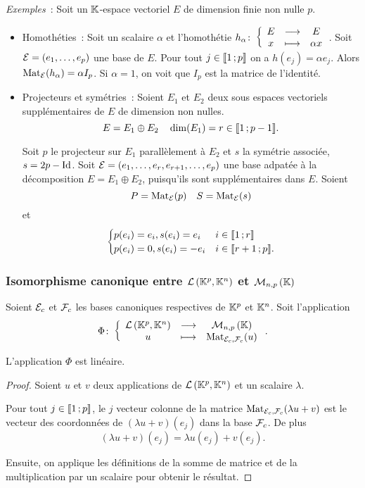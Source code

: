 \emph{Exemples}~: Soit un \(\mathbb{K}\)-espace vectoriel \(E\) de dimension finie non nulle \(p\).
\begin{itemize}
\item Homothéties~: Soit un scalaire \(\alpha\) et l'homothétie \(h_\alpha\colon \left\{\begin{array}{ccc} E & \longrightarrow &E\\ x & \longmapsto & \alpha x \end{array} \right.\). Soit \(\mathcal{E}=(e_1,\ldots, e_p)\) une base de \(E\). Pour tout \(j \in \mathopen{\llbracket}1\mathclose{}\mathpunct{};p\mathclose{\rrbracket}\) on a \(h(e_j)=\alpha e_j\). Alors \(\mathrm{Mat}_{\mathcal{E}}(h_\alpha)=\alpha I_p\). Si \(\alpha=1\), on voit que \(I_p\) est la matrice de l'identité.
\item Projecteurs et symétries~: Soient \(E_1\) et \(E_2\) deux sous espaces vectoriels supplémentaires de \(E\) de dimension non nulles.
  \begin{equation}
    E=E_1 \oplus E_2 \quad \dim(E_1)=r \in \mathopen{\llbracket}1\mathclose{}\mathpunct{};p-1\mathclose{\rrbracket}.
  \end{equation}

Soit \(p\) le projecteur sur \(E_1\) parallèlement à \(E_2\) et \(s\) la symétrie associée, \(s=2p -\operatorname{Id}\). Soit \(\mathcal{E}=(e_1, \ldots, e_r, e_{r+1}, \ldots, e_p)\) une base adpatée à la décomposition \(E=E_1 \oplus E_2\), puisqu'ils sont supplémentaires dans \(E\). Soient
\begin{equation}
  P=\mathrm{Mat}_{\mathcal{E}}(p) \quad S=\mathrm{Mat}_{\mathcal{E}}(s)
\end{equation}
et
\begin{equation}
  \begin{cases}
    p(e_i)=e_i, s(e_i)=e_i & i \in \mathopen{\llbracket}1\mathclose{}\mathpunct{};r\mathclose{\rrbracket} \\
    p(e_i)=0, s(e_i)=-e_i & i \in \mathopen{\llbracket}r+1\mathclose{}\mathpunct{};p\mathclose{\rrbracket}.
  \end{cases}
\end{equation}
\end{itemize}

\subsubsection{Isomorphisme canonique entre \(\mathcal{L}\left(\mathbb{K}^p,\mathbb{K}^n\right)\) et \(\mathcal{M}_{n,p}\left(\mathbb{K}\right)\)}


Soient \(\mathcal{E}_c\) et \(\mathcal{F}_c\) les bases canoniques respectives de \(\mathbb{K}^p\) et \(\mathbb{K}^n\). Soit l'application \[\Phi\colon \left\{\begin{array}{ccc} \mathcal{L}\left(\mathbb{K}^p,\mathbb{K}^n\right) & \longrightarrow &\mathcal{M}_{n,p}\left(\mathbb{K}\right)\\ u & \longmapsto & \mathrm{Mat}_{\mathcal{E}_c,\mathcal{F}_c}(u) \end{array} \right..\]

\begin{prop}
  L'application \(\Phi\) est linéaire.
\end{prop}
\begin{proof}
  Soient \(u\) et \(v\) deux applications de \(\mathcal{L}\left(\mathbb{K}^p,\mathbb{K}^n\right)\) et un scalaire \(\lambda\). 

Pour tout \(j \in \mathopen{\llbracket}1\mathclose{}\mathpunct{};p\mathclose{\rrbracket}\), le \(j\)\ieme{} vecteur colonne de la matrice \(\mathrm{Mat}_{\mathcal{E}_c,\mathcal{F}_c}(\lambda u+v)\) est le vecteur des coordonnées de \((\lambda u+v)(e_j)\) dans la base \(\mathcal{F}_c\). De plus
\begin{equation}
  (\lambda u+v)(e_j) = \lambda u(e_j) +v(e_j).
\end{equation}

Ensuite, on applique les définitions de la somme de matrice et de la multiplication par un scalaire pour obtenir le résultat.
\end{proof}

